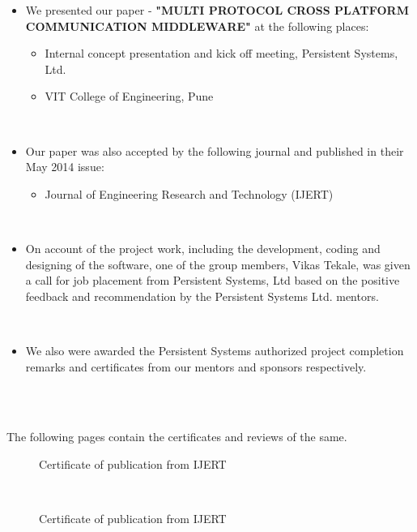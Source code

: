 \documentclass{SureshLimkar}
\begin{document}
\begin{itemize}

\item We presented our paper - \textbf{"MULTI PROTOCOL CROSS PLATFORM COMMUNICATION MIDDLEWARE"} at the following places:
\begin{itemize}
\item Internal concept presentation and kick off meeting, Persistent Systems, Ltd.
 \item VIT College of Engineering, Pune
\end{itemize}
\\

\item Our paper was also accepted by the following journal and published in their May 2014 issue: 
\begin{itemize}
 \item Journal of Engineering Research and Technology (IJERT)
\end{itemize}
\\

\item On account of the project work, including the development, coding and designing of the software, one of the group members, Vikas Tekale, was given a call for job placement from Persistent Systems, Ltd based 
on the positive feedback and recommendation by the Persistent Systems Ltd. mentors. 

\\

\item We also were awarded the Persistent Systems authorized project completion remarks and certificates from our mentors and sponsors respectively.

\\
\end{itemize}

\\
The following pages contain the certificates and reviews of the same.

\newpage



\begin{figure}[h]%
\centering
{}%
\caption{Certificate of publication from IJERT}%
\label{certificates}%
\end{figure}
\\
\begin{figure}[h]%
\centering
{}%
\caption{Certificate of publication from IJERT}%
\label{certificates}%
\end{figure}
\\
\newpage
%
\end{document}
